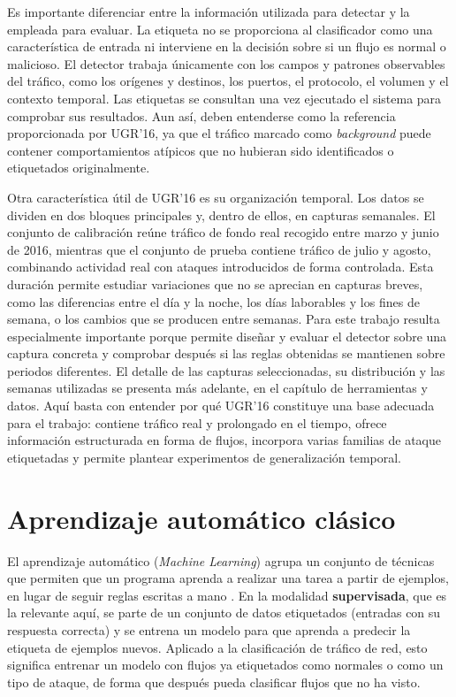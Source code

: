 Es importante diferenciar entre la información utilizada para detectar y la empleada para evaluar. La etiqueta no se proporciona al clasificador como una característica de entrada ni interviene en la decisión sobre si un flujo es normal o malicioso. El detector trabaja únicamente con los campos y patrones observables del tráfico, como los orígenes y destinos, los puertos, el protocolo, el volumen y el contexto temporal. Las etiquetas se consultan una vez ejecutado el sistema para comprobar sus resultados. Aun así, deben entenderse como la referencia proporcionada por UGR'16, ya que el tráfico marcado como \emph{background} puede contener comportamientos atípicos que no hubieran sido identificados o etiquetados originalmente.

Otra característica útil de UGR'16 es su organización temporal. Los datos se dividen en dos bloques principales y, dentro de ellos, en capturas semanales. El conjunto de calibración reúne tráfico de fondo real recogido entre marzo y junio de 2016, mientras que el conjunto de prueba contiene tráfico de julio y agosto, combinando actividad real con ataques introducidos de forma controlada. Esta duración permite estudiar variaciones que no se aprecian en capturas breves, como las diferencias entre el día y la noche, los días laborables y los fines de semana, o los cambios que se producen entre semanas. Para este trabajo resulta especialmente importante porque permite diseñar y evaluar el detector sobre una captura concreta y comprobar después si las reglas obtenidas se mantienen sobre periodos diferentes. El detalle de las capturas seleccionadas, su distribución y las semanas utilizadas se presenta más adelante, en el capítulo de herramientas y datos. Aquí basta con entender por qué UGR'16 constituye una base adecuada para el trabajo: contiene tráfico real y prolongado en el tiempo, ofrece información estructurada en forma de flujos, incorpora varias familias de ataque etiquetadas y permite plantear experimentos de generalización temporal.

\section{Aprendizaje automático clásico}
\label{sec:concep_ml}

El aprendizaje automático (\emph{Machine Learning}) agrupa un conjunto de técnicas que permiten que un programa aprenda a realizar una tarea a partir de ejemplos, en lugar de seguir reglas escritas a mano \cite{hastie2009elements}. En la modalidad \textbf{supervisada}, que es la relevante aquí, se parte de un conjunto de datos etiquetados (entradas con su respuesta correcta) y se entrena un modelo para que aprenda a predecir la etiqueta de ejemplos nuevos. Aplicado a la clasificación de tráfico de red, esto significa entrenar un modelo con flujos ya etiquetados como normales o como un tipo de ataque, de forma que después pueda clasificar flujos que no ha visto.

